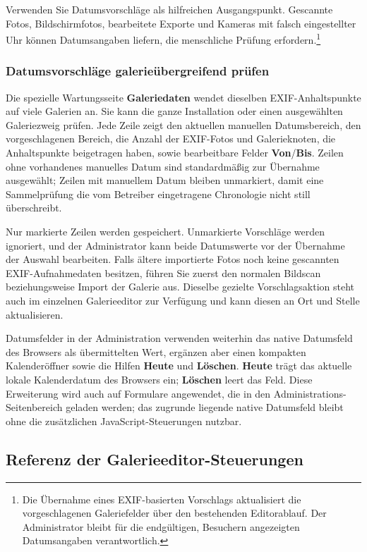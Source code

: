 \documentclass[11pt,a4paper]{article}
\newcommand{\ui}[1]{\textbf{#1}}
\begin{document}
Verwenden Sie Datumsvorschläge als hilfreichen Ausgangspunkt. Gescannte Fotos,
Bildschirmfotos, bearbeitete Exporte und Kameras mit falsch eingestellter Uhr
können Datumsangaben liefern, die menschliche Prüfung erfordern.\footnote{Die
Übernahme eines EXIF-basierten Vorschlags aktualisiert die vorgeschlagenen
Galeriefelder über den bestehenden Editorablauf. Der Administrator bleibt für
die endgültigen, Besuchern angezeigten Datumsangaben verantwortlich.}

\subsubsection{Datumsvorschläge galerieübergreifend prüfen}

Die spezielle Wartungsseite \ui{Galeriedaten} wendet dieselben
EXIF-Anhaltspunkte auf viele Galerien an. Sie kann die ganze Installation oder
einen ausgewählten Galeriezweig prüfen. Jede Zeile zeigt den aktuellen manuellen
Datumsbereich, den vorgeschlagenen Bereich, die Anzahl der EXIF-Fotos und
Galerieknoten, die Anhaltspunkte beigetragen haben, sowie bearbeitbare Felder
\ui{Von}/\ui{Bis}. Zeilen ohne vorhandenes manuelles Datum sind standardmäßig
zur Übernahme ausgewählt; Zeilen mit manuellem Datum bleiben unmarkiert, damit
eine Sammelprüfung die vom Betreiber eingetragene Chronologie nicht still
überschreibt.

Nur markierte Zeilen werden gespeichert. Unmarkierte Vorschläge werden
ignoriert, und der Administrator kann beide Datumswerte vor der Übernahme der
Auswahl bearbeiten. Falls ältere importierte Fotos noch keine gescannten
EXIF-Aufnahmedaten besitzen, führen Sie zuerst den normalen Bildscan
beziehungsweise Import der Galerie aus. Dieselbe gezielte Vorschlagsaktion steht
auch im einzelnen Galerieeditor zur Verfügung und kann diesen an Ort und Stelle
aktualisieren.

Datumsfelder in der Administration verwenden weiterhin das native Datumsfeld des
Browsers als übermittelten Wert, ergänzen aber einen kompakten Kalenderöffner
sowie die Hilfen \ui{Heute} und \ui{Löschen}. \ui{Heute} trägt das aktuelle
lokale Kalenderdatum des Browsers ein; \ui{Löschen} leert das Feld. Diese
Erweiterung wird auch auf Formulare angewendet, die in den
Administrations-Seitenbereich geladen werden; das zugrunde liegende native
Datumsfeld bleibt ohne die zusätzlichen JavaScript-Steuerungen nutzbar.

\subsection{Referenz der Galerieeditor-Steuerungen}
\end{document}
